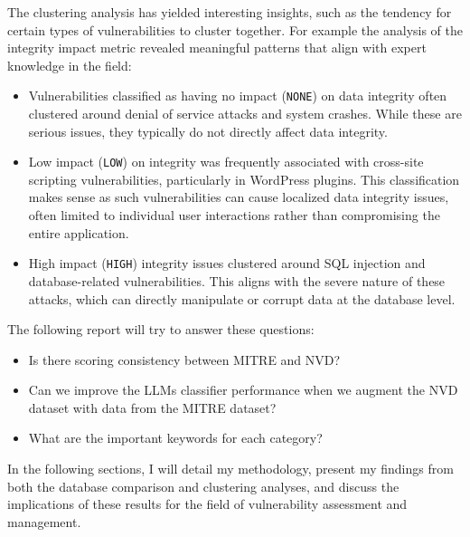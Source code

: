\documentclass[12pt]{article}
\begin{document}
The clustering analysis has yielded interesting insights, such as the tendency for certain types of
vulnerabilities to cluster together. For example the analysis of the integrity impact metric revealed meaningful patterns that align with expert knowledge in the field:

\begin{itemize}

	\item Vulnerabilities classified as having no impact (\texttt{NONE}) on data integrity often
	      clustered around denial of service attacks and system crashes. While these are serious
	      issues, they typically do not directly affect data integrity.

	\item Low impact (\texttt{LOW}) on integrity was frequently associated with cross-site scripting
	      vulnerabilities, particularly in WordPress plugins. This classification makes sense as such
	      vulnerabilities can cause localized data integrity issues, often limited to individual user
	      interactions rather than compromising the entire application.

	\item High impact (\texttt{HIGH}) integrity issues clustered around SQL injection and
	      database-related vulnerabilities. This aligns with the severe nature of these attacks, which
	      can directly manipulate or corrupt data at the database level.

\end{itemize}

The following report will try to answer these questions:

\begin{itemize}
	\item Is there scoring consistency between MITRE and NVD?

	\item Can we improve the LLMs classifier performance when we augment the NVD dataset with data
	      from the MITRE dataset?

	\item What are the important keywords for each category?
\end{itemize}

In the following sections, I will detail my methodology, present my findings from both the
database comparison and clustering analyses, and discuss the implications of these results for the
field of vulnerability assessment and management.
\end{document}
